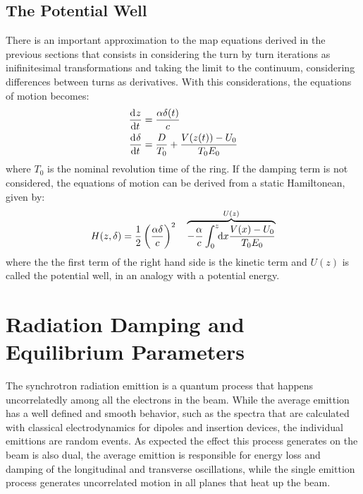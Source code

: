 \documentclass[
	12pt,				%
	openright,			%
	oneside,			%
	a4paper,		%
	chapter=TITLE,		%
	section=TITLE,		%
    brazil,				%
	english,			%
	sumario=tradicional,
	]{abntex2}
\begin{document}
    \subsection{The Potential Well}

	There is an important approximation to the map equations derived in the previous sections that consists in considering the turn by turn iterations as inifinitesimal transformations and taking the limit to the continuum, considering differences between turns as derivatives. With this considerations, the equations of motion becomes:
	\begin{align}
		\dertot{z}{t} &= \frac{\alpha \delta(t)}{c} \\\nonumber
		\dertot{\delta}{t} &= \frac{D}{T_0} + \frac{V(z(t))-U_0}{T_0E_0}
	\end{align}
	where $T_0$ is the nominal revolution time of the ring. If the damping term is not considered, the equations of motion can be derived from a static Hamiltonean, given by:
	\begin{align}
		H(z, \delta) = \frac12\left(\frac{\alpha\delta}{c}\right)^2 \quad \overbrace{- \frac{\alpha}{c}\defint{x}{\frac{V(x)-U_0}{T_0E_0}}{0}{z}}^{U(z)}
	\end{align}
	where the the first term of the right hand side is the kinetic term and $U(z)$ is called the potential well, in an analogy with a potential energy.

  \section{Radiation Damping and Equilibrium Parameters}

  The synchrotron radiation emittion is a quantum process that happens uncorrelatedly among all the electrons in the beam. While the average emittion has a well defined and smooth behavior, such as the spectra that are calculated with classical electrodynamics for dipoles and insertion devices, the individual emittions are random events. As expected the effect this process generates on the beam is also dual, the average emittion is responsible for energy loss and damping of the longitudinal and transverse oscillations, while the single emittion process generates uncorrelated motion in all planes that heat up the beam.
\end{document}
